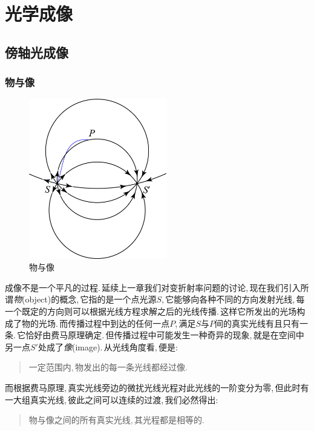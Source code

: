 \chapter{光学成像}

\section{傍轴光成像}

\subsection{物与像}
\begin{figure}
\centering
\vspace{-1cm}
\includegraphics[width=6cm]{image/5-7-1.png}
\caption{物与像}
\end{figure}
成像不是一个平凡的过程.\,延续上一章我们对变折射率问题的讨论,\,现在我们引入所谓\emph{物}(object)的概念,\,它指的是一个点光源\(S\),\,它能够向各种不同的方向发射光线,\,每一个既定的方向则可以根据光线方程求解之后的光线传播.\,这样它所发出的光场构成了物的光场.\,而传播过程中到达的任何一点\(P\),\,满足\(S\)与\(P\)间的真实光线有且只有一条.\,它恰好由费马原理确定.\,但传播过程中可能发生一种奇异的现象,\,就是在空间中另一点\(S'\)处成了\emph{像}(image).\,从光线角度看,\,便是:

\begin{quote}
一定范围内,\,物发出的每一条光线都经过像.
\end{quote}

而根据费马原理,\,真实光线旁边的微扰光线光程对此光线的一阶变分为零,\,但此时有一大组真实光线,\,彼此之间可以连续的过渡,\,我们必然得出:

\begin{quote}
物与像之间的所有真实光线,\,其光程都是相等的.
\end{quote}

